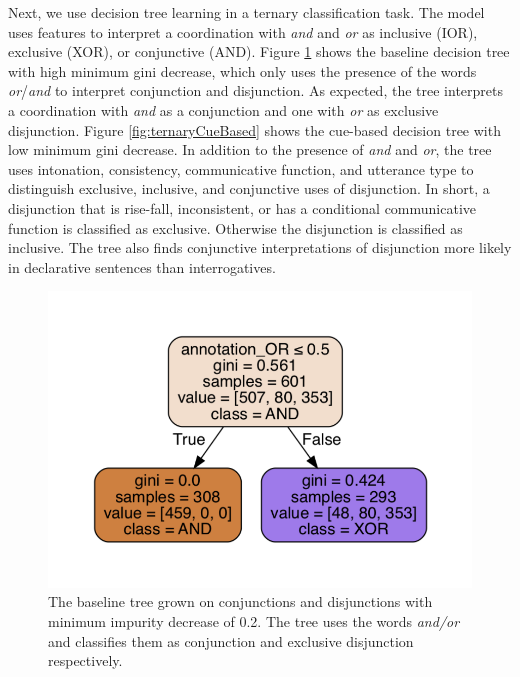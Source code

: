 \documentclass[,man,floatsintext]{apa6}
\begin{document}
Next, we use decision tree learning in a ternary classification task. The model uses features to interpret a coordination with \emph{and} and \emph{or} as inclusive (IOR), exclusive (XOR), or conjunctive (AND). Figure \ref{fig:ternaryBaseline} shows the baseline decision tree with high minimum gini decrease, which only uses the presence of the words \emph{or}/\emph{and} to interpret conjunction and disjunction. As expected, the tree interprets a coordination with \emph{and} as a conjunction and one with \emph{or} as exclusive disjunction. Figure \ref{fig:ternaryCueBased} shows the cue-based decision tree with low minimum gini decrease. In addition to the presence of \emph{and} and \emph{or}, the tree uses intonation, consistency, communicative function, and utterance type to distinguish exclusive, inclusive, and conjunctive uses of disjunction. In short, a disjunction that is rise-fall, inconsistent, or has a conditional communicative function is classified as exclusive. Otherwise the disjunction is classified as inclusive. The tree also finds conjunctive interpretations of disjunction more likely in declarative sentences than interrogatives.

\begin{figure}
\centering
\includegraphics{figs/ternaryBaseline-1.pdf}
\caption{\label{fig:ternaryBaseline}The baseline tree grown on conjunctions and disjunctions with minimum impurity decrease of 0.2. The tree uses the words \textit{and/or} and classifies them as conjunction and exclusive disjunction respectively.}
\end{figure}
\end{document}
